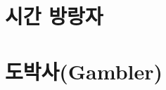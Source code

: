 \documentclass{report}
\begin{document}
	\section{시간 방랑자}
		
		
	\section{도박사(Gambler)}
		
\end{document}
